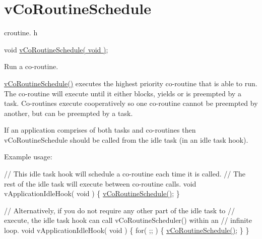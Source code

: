 \hypertarget{group__vCoRoutineSchedule}{}\section{v\+Co\+Routine\+Schedule}
\label{group__vCoRoutineSchedule}
croutine. h 
\begin{DoxyPre}
void \hyperlink{croutine_8h_a5333c649a2c063006ca3cd7a3b5b9240}{vCoRoutineSchedule( void )};\end{DoxyPre}


Run a co-\/routine.

\hyperlink{croutine_8h_a5333c649a2c063006ca3cd7a3b5b9240}{v\+Co\+Routine\+Schedule()} executes the highest priority co-\/routine that is able to run. The co-\/routine will execute until it either blocks, yields or is preempted by a task. Co-\/routines execute cooperatively so one co-\/routine cannot be preempted by another, but can be preempted by a task.

If an application comprises of both tasks and co-\/routines then v\+Co\+Routine\+Schedule should be called from the idle task (in an idle task hook).

Example usage\+: 
\begin{DoxyPre}
// This idle task hook will schedule a co-routine each time it is called.
// The rest of the idle task will execute between co-routine calls.
void vApplicationIdleHook( void )
\{
   \hyperlink{croutine_8h_a5333c649a2c063006ca3cd7a3b5b9240}{vCoRoutineSchedule()};
\}\end{DoxyPre}



\begin{DoxyPre}// Alternatively, if you do not require any other part of the idle task to
// execute, the idle task hook can call vCoRoutineScheduler() within an
// infinite loop.
void vApplicationIdleHook( void )
\{
   for( ;; )
   \{
       \hyperlink{croutine_8h_a5333c649a2c063006ca3cd7a3b5b9240}{vCoRoutineSchedule()};
   \}
\}
\end{DoxyPre}
 